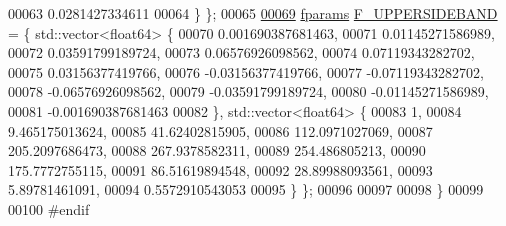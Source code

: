\begin{DoxyCode}
00063             0.0281427334611
00064     \} \};
00065 
\hypertarget{fvectors_8hpp_source_l00069}{}\hyperlink{namespaceradio_a0ec4548711b6d6ed6867c70b3fc2a413}{00069}     \hyperlink{definitions_8hpp_a7615684c2af56be5f302c5b367d71f6b}{fparams} \hyperlink{namespaceradio_a0ec4548711b6d6ed6867c70b3fc2a413}{F\_UPPERSIDEBAND} = \{ std::vector<float64> \{
00070         0.001690387681463, 
00071             0.01145271586989, 
00072             0.03591799189724, 
00073             0.06576926098562,
00074             0.07119343282702,
00075             0.03156377419766,
00076             -0.03156377419766,
00077             -0.07119343282702,
00078             -0.06576926098562,
00079             -0.03591799189724,
00080             -0.01145271586989,
00081             -0.001690387681463
00082     \}, std::vector<float64> \{
00083         1,  
00084             9.465175013624,
00085             41.62402815905,
00086             112.0971027069,
00087             205.2097686473,    
00088             267.9378582311,     
00089             254.486805213,
00090             175.7772755115,
00091             86.51619894548,   
00092             28.89988093561,     
00093             5.89781461091,
00094             0.5572910543053   
00095     \} \};
00096 
00097 
00098 \}
00099 
00100 \textcolor{preprocessor}{#endif}
\end{DoxyCode}
